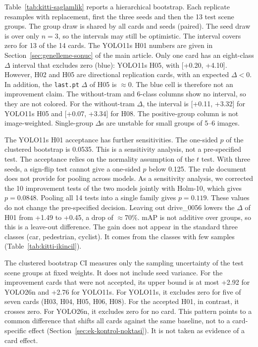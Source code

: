 

Table~\ref{tab:kitti-saglamlik} reports a hierarchical bootstrap. Each replicate resamples with replacement, first the three seeds and then the 13 test scene groups. The group draw is shared by all cards and seeds (paired). The seed draw is over only $n=3$, so the intervals may still be optimistic. The interval covers zero for 13 of the 14 cards. The YOLO11s H01 numbers are given in Section~\ref{sec:genelleme-sonuc} of the main article. Only one card has an eight-class $\Delta$ interval that excludes zero (blue): YOLO11s H05, with [+0.20, +4.10]. However, H02 and H05 are directional replication cards, with an expected $\Delta<0$. In addition, the \texttt{last.pt} $\Delta$ of H05 is $\approx$0. The blue cell is therefore not an improvement claim. The without-tram and 6-class columns show no interval, so they are not colored. For the without-tram $\Delta$, the interval is [+0.11, +3.32] for YOLO11s H05 and [+0.07, +3.34] for H08. The positive-group column is not image-weighted. Single-group $\Delta$s are unstable for small groups of 5--6 images.

The YOLO11s H01 acceptance has further sensitivities. The one-sided $p$ of the clustered bootstrap is 0.0535. This is a sensitivity analysis, not a pre-specified test. The acceptance relies on the normality assumption of the $t$ test. With three seeds, a sign-flip test cannot give a one-sided $p$ below 0.125. The rule document does not provide for pooling across models. As a sensitivity analysis, we corrected the 10 improvement tests of the two models jointly with Holm-10, which gives $p=0.0848$. Pooling all 14 tests into a single family gives $p=0.119$. These values do not change the pre-specified decision. Leaving out drive\_0056 lowers the $\Delta$ of H01 from +1.49 to +0.45, a drop of $\approx$70\%. mAP is not additive over groups, so this is a leave-out difference. The gain does not appear in the standard three classes (car, pedestrian, cyclist). It comes from the classes with few samples (Table~\ref{tab:kitti-ikincil}).

The clustered bootstrap CI measures only the sampling uncertainty of the test scene groups at fixed weights. It does not include seed variance. For the improvement cards that were not accepted, its upper bound is at most +2.92 for YOLO26n and +2.76 for YOLO11s. For YOLO11s, it excludes zero for five of seven cards (H03, H04, H05, H06, H08). For the accepted H01, in contrast, it crosses zero. For YOLO26n, it excludes zero for no card. This pattern points to a common difference that shifts all cards against the same baseline, not to a card-specific effect (Section~\ref{sec:ek-kontrol-noktasi}). It is not taken as evidence of a card effect.

